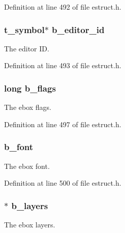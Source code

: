 Definition at line 492 of file estruct.\-h.

\hypertarget{struct__edspbox_adf8c80c6ea45ad810c754984d98830ff}{
\subsubsection[{b\-\_\-editor\-\_\-id}]{\setlength{\rightskip}{0pt plus 5cm}t\-\_\-symbol$\ast$ b\-\_\-editor\-\_\-id}}\label{struct__edspbox_adf8c80c6ea45ad810c754984d98830ff}
The editor I\-D. 

Definition at line 493 of file estruct.\-h.

\hypertarget{struct__edspbox_abdae234dbd983dfbfb0592858c4ff026}{
\subsubsection[{b\-\_\-flags}]{\setlength{\rightskip}{0pt plus 5cm}long b\-\_\-flags}}\label{struct__edspbox_abdae234dbd983dfbfb0592858c4ff026}
The ebox flags. 

Definition at line 497 of file estruct.\-h.

\hypertarget{struct__edspbox_a4071412a20456f5fcafe2a91cdef11c3}{
\subsubsection[{b\-\_\-font}]{ b\-\_\-font}}\label{struct__edspbox_a4071412a20456f5fcafe2a91cdef11c3}
The ebox font. 

Definition at line 500 of file estruct.\-h.

\hypertarget{struct__edspbox_ad80949f483467d74761a9e321300d64e}{
\subsubsection[{b\-\_\-layers}]{$\ast$ b\-\_\-layers}}\label{struct__edspbox_ad80949f483467d74761a9e321300d64e}
The ebox layers. 


